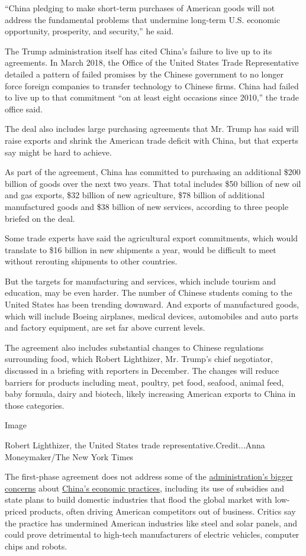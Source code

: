 ``China pledging to make short-term purchases of American goods will not
address the fundamental problems that undermine long-term U.S. economic
opportunity, prosperity, and security,'' he said.

The Trump administration itself has cited China's failure to live up to
its agreements. In March 2018, the Office of the United States Trade
Representative detailed a pattern of failed promises by the Chinese
government to no longer force foreign companies to transfer technology
to Chinese firms. China had failed to live up to that commitment ``on at
least eight occasions since 2010,'' the trade office said.

The deal also includes large purchasing agreements that Mr. Trump has
said will raise exports and shrink the American trade deficit with
China, but that experts say might be hard to achieve.

As part of the agreement, China has committed to purchasing an
additional \$200 billion of goods over the next two years. That total
includes \$50 billion of new oil and gas exports, \$32 billion of new
agriculture, \$78 billion of additional manufactured goods and \$38
billion of new services, according to three people briefed on the deal.

Some trade experts have said the agricultural export commitments, which
would translate to \$16 billion in new shipments a year, would be
difficult to meet without rerouting shipments to other countries.

But the targets for manufacturing and services, which include tourism
and education, may be even harder. The number of Chinese students coming
to the United States has been trending downward. And exports of
manufactured goods, which will include Boeing airplanes, medical
devices, automobiles and auto parts and factory equipment, are set far
above current levels.

The agreement also includes substantial changes to Chinese regulations
surrounding food, which Robert Lighthizer, Mr. Trump's chief negotiator,
discussed in a briefing with reporters in December. The changes will
reduce barriers for products including meat, poultry, pet food, seafood,
animal feed, baby formula, dairy and biotech, likely increasing American
exports to China in those categories.

Image

Robert Lighthizer, the United States trade representative.Credit...Anna
Moneymaker/The New York Times

The first-phase agreement does not address some of the
\href{https://www.nytimes3xbfgragh.onion/2019/05/12/business/china-trump-trade-subsidies.html}{administration's
bigger concerns} about
\href{https://www.nytimes3xbfgragh.onion/interactive/2018/11/25/world/asia/china-economy-strategy.html}{China's
economic practices}, including its use of subsidies and state plans to
build domestic industries that flood the global market with low-priced
products, often driving American competitors out of business. Critics
say the practice has undermined American industries like steel and solar
panels, and could prove detrimental to high-tech manufacturers of
electric vehicles, computer chips and robots.

